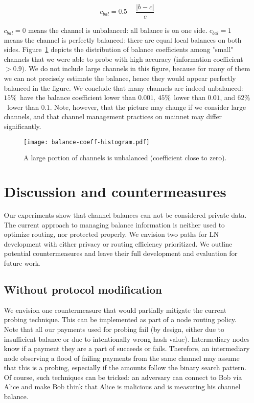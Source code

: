 \[c_{bal} = 0.5 - \frac{|b-c|}{c} \]

$c_{bal} = 0$ means the channel is unbalanced: all balance is on one side.
$c_{bal} = 1$ means the channel is perfectly balanced: there are equal local balances on both sides.
Figure~\ref{fig:balance-coeff-histogram} depicts the distribution of balance coefficients among "small" channels that we were able to probe with high accuracy (information coefficient $> 0.9$).
We do not include large channels in this figure, because for many of them we can not precisely estimate the balance, hence they would appear perfectly balanced in the figure.
We conclude that many channels are indeed unbalanced: $15\%$~have the balance coefficient lower than $0.001$, $45\%$~lower than $0.01$, and $62\%$~lower than $0.1$.
Note, however, that the picture may change if we consider large channels, and that channel management practices on mainnet may differ significantly.

\begin{figure}[]
	\centering
	\texttt{[image: balance-coeff-histogram.pdf]}
	\caption{A large portion of channels is unbalanced (coefficient close to zero).}
	\label{fig:balance-coeff-histogram}
\end{figure}





\section{Discussion and countermeasures} \label{sec:discussion}
Our experiments show that channel balances can not be considered private data.
The current approach to managing balance information is neither used to optimize routing, nor protected properly.
We envision two paths for LN development with either privacy or routing efficiency prioritized.
We outline potential countermeasures and leave their full development and evaluation for future work.

\subsection{Without protocol modification}
We envision one countermeasure that would partially mitigate the current probing technique.
This can be implemented as part of a node routing policy.
Note that all our payments used for probing fail (by design, either due to insufficient balance or due to intentionally wrong hash value). 
Intermediary nodes know if a payment they are a part of succeeds or fails.
Therefore, an intermediary node observing a flood of failing payments from the same channel may assume that this is a probing, especially if the amounts follow the binary search pattern.
Of course, such techniques can be tricked: an adversary can connect to Bob via Alice and make Bob think that Alice is malicious and is measuring his channel balance.



